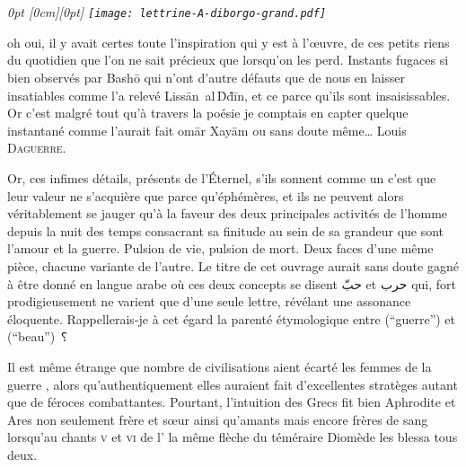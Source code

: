 
\section*{}
\thispagestyle{empty}
{
  \em\small
  0pt \textwidth
  0pt                \textwidth
  \noindent{}\raisebox{-\height+0.565cm}[0cm][0pt]{
    \hspace{-1.7cm}\texttt{[image: lettrine-A-diborgo-grand.pdf]}%
  }%
  oh oui, il y avait certes toute l’inspiration qui y est à l’œuvre, de ces petits riens du quotidien que l’on ne sait précieux que lorsqu’on les perd. Instants fugaces si bien observés par Bashō qui n’ont d’autre défauts que de nous en laisser insatiables comme l’a relevé Lissān~al\,Ḋḋīn, et ce parce qu’ils sont insaisissables. Or c’est malgré tout  qu’à travers la poésie je comptais en capter quelque instantané comme l’aurait fait omār Xayām ou sans doute même… Louis \textsc{Daguerre}.

  Or, ces infimes détails, présents de l’Éternel, s’ils sonnent comme un  c’est  que leur valeur ne s’acquière que parce qu’éphémères, et ils ne peuvent alors véritablement se jauger qu’à la faveur des deux principales activités de l’homme depuis la nuit des temps consacrant sa finitude au sein de sa grandeur que sont l’amour et la guerre. Pulsion de vie, pulsion de mort. Deux faces d’une même pièce, chacune variante de l’autre. Le titre de cet ouvrage aurait sans doute gagné à être donné en langue arabe où ces deux concepts se disent  \textarabic{حبّ} et  \textarabic{حرب} qui, fort prodigieusement ne varient que d’une seule lettre, révélant une assonance éloquente. Rappellerais-je à cet égard la parenté étymologique entre  (\enquote{guerre}) et  (\enquote{beau}) ⸮

   Il est même étrange que nombre de civilisations aient écarté les femmes de la guerre , alors qu’authentiquement elles auraient fait d’excellentes stratèges autant que de féroces combattantes. Pourtant, l’intuition des Grecs fit bien Aphrodite et Ares non seulement frère et sœur ainsi qu’amants mais encore frères de sang lorsqu’au chants \textsc{v} et \textsc{vi} de l’ la même flèche du téméraire Diomède les blessa tous deux.

}
